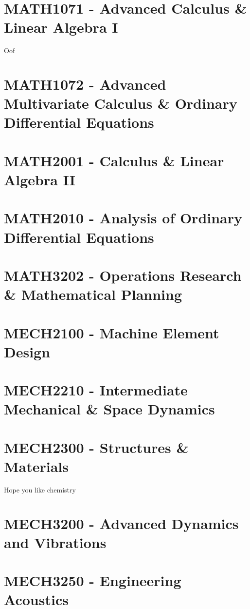\documentclass[a4paper,12pt]{report}
\begin{document}
\hypertarget{MATH1071}{\section{MATH1071 - Advanced Calculus \& Linear Algebra I}}
Oof

\hypertarget{MATH1072}{\section{MATH1072 - Advanced Multivariate Calculus \& Ordinary Differential Equations}}

\hypertarget{MATH2001}{\section{MATH2001 - Calculus \& Linear Algebra II}}

\hypertarget{MATH2010}{\section{MATH2010 - Analysis of Ordinary Differential Equations}}

\hypertarget{MATH3202}{\section{MATH3202 - Operations Research \& Mathematical Planning}}

\hypertarget{MECH2100}{\section{MECH2100 - Machine Element Design}}

\hypertarget{MECH2210}{\section{MECH2210 - Intermediate Mechanical \& Space Dynamics}}

\hypertarget{MECH2300}{\section{MECH2300 - Structures \& Materials}}
Hope you like chemistry

\hypertarget{MECH3200}{\section{MECH3200 - Advanced Dynamics and Vibrations}}

\hypertarget{MECH3250}{\section{MECH3250 - Engineering Acoustics}}
\end{document}
